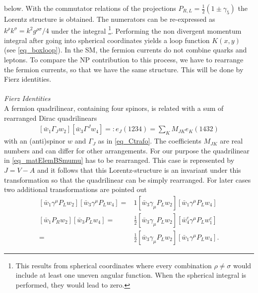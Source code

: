 below. With the commutator relations of the projections
$P_{R,L}=\frac12(1\pm\gamma_5)$ the Lorentz structure is obtained. The numerators can be re-expressed as $k^\rho k^\sigma = k^2g^{\rho\sigma}/4$
under the integral \footnote{This results from spherical coordinates where
every combination $\rho\neq\sigma$ would include at least one uneven angular function. When the spherical integral is performed, they would lead to zero.}.
Performing the non divergent momentum integral after going into spherical coordinates yields a loop function $K(x,y)$ (see \eqref{eq_boxloop}).
In the SM, the fermion currents do not combine quarks and leptons. To compare the NP contribution to this process, we have to rearrange the fermion currents,
so that we have the same structure. This will be done by Fierz identities.
\\ \\ \noindent \textit{Fierz Identities}\\
 A fermion quadrilinear, containing four spinors, is related with a sum of rearranged Dirac quadrilinears \cite{Fierz}
\begin{align}
  \left[\bar w_1\Gamma_J^{} w_2\right] \left[\bar w_3 \Gamma^J w_4 \right] =: e_J(1234) = \sum\limits_K M_{JK} e_K(1432)
\end{align}
with an (anti)spinor $w$ and $\Gamma_J$ as in \eqref{eq_Ctrafo}. The coefficients $M_{JK}$ are real numbers and can differ for other arrangements.
For our purpose the quadrilinear in \eqref{eq_matElemBSmumu} has to be rearranged. This case is represented by $J=V-A$ and it follows that this
Lorentz-structure is an invariant under this transformation so that the quadrilinear can be simply rearranged. For later cases two additional
transformations are pointed out 
\begin{subequations}
\begin{align}
 \left[\bar w_1 \gamma^\mu P_L w_2\right]\left[\bar w_3 \gamma^\mu P_L w_4\right] =& 1  \left[\bar w_3 \gamma_\mu P_L w_2\right]\left[\bar w_1 \gamma^\mu P_L w_4\right]\\
 \left[\bar w_1 P_R w_2\right]\left[\bar w_3 P_L w_4\right] =& \frac12  \left[\bar w_3 \gamma_\mu P_L w_2\right]\left[\bar w^c_4 \gamma^\mu P_L w_1^c\right]\\
 =& \frac12  \left[\bar w_3 \gamma_\mu P_L w_2\right]\left[\bar w_1 \gamma^\mu P_L w_4\right].
 \label{eq_fierzSPtoVA}
\end{align} 
\end{subequations}
